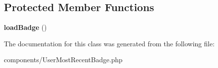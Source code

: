 \subsection*{Protected Member Functions}
\begin{DoxyCompactItemize}
\item 
\hypertarget{classDMA_1_1Friends_1_1Components_1_1UserMostRecentBadge_a179a91722a84fac694d318d67c97f0e0}{}{\bfseries load\+Badge} ()\label{classDMA_1_1Friends_1_1Components_1_1UserMostRecentBadge_a179a91722a84fac694d318d67c97f0e0}

\end{DoxyCompactItemize}


The documentation for this class was generated from the following file\+:\begin{DoxyCompactItemize}
\item 
components/User\+Most\+Recent\+Badge.\+php\end{DoxyCompactItemize}

